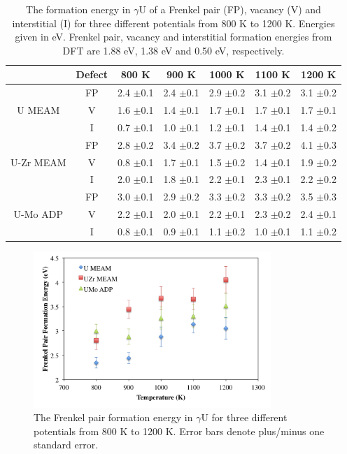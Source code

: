 \documentclass[review]{elsarticle}
\begin{document}
\begin{table}[h]
\caption{The formation energy in $\gamma$U of a Frenkel pair (FP), vacancy (V) and interstitial (I) for three different potentials from 800 K to 1200 K. Energies given in eV. Frenkel pair, vacancy and interstitial formation energies from DFT \cite{beeler2010} are 1.88 eV, 1.38 eV and 0.50 eV, respectively. } \label{tab:eform}
\begin{center}
\begin{tabular}{|c|c|c|c|c|c|c|}
	\hline
			& Defect	& 800 K & 900 K & 1000 K & 1100 K & 1200 K \\
	 \hline
			& FP	 & 2.4 $\pm$0.1 & 2.4 $\pm$0.1 & 2.9 $\pm$0.2 & 3.1 $\pm$0.2 & 3.1 $\pm$0.2  \\
	 U MEAM 	& V	& 1.6 $\pm$0.1 & 1.4 $\pm$0.1 & 1.7 $\pm$0.1 & 1.7 $\pm$0.1 & 1.7 $\pm$0.1  \\
	 		& I	& 0.7 $\pm$0.1 & 1.0 $\pm$0.1 & 1.2 $\pm$0.1 & 1.4 $\pm$0.1 & 1.4 $\pm$0.2   \\
	\hline
	 		& FP	& 2.8 $\pm$0.2 & 3.4 $\pm$0.2 & 3.7 $\pm$0.2 & 3.7 $\pm$0.2 & 4.1 $\pm$0.3 \\
	 U-Zr MEAM & V & 0.8 $\pm$0.1 & 1.7 $\pm$0.1 & 1.5 $\pm$0.2 & 1.4 $\pm$0.1 & 1.9 $\pm$0.2 \\
			& I	& 2.0 $\pm$0.1 & 1.8 $\pm$0.1 & 2.2 $\pm$0.1 & 2.3 $\pm$0.1 & 2.2 $\pm$0.2 \\
	 \hline
	 		& FP	& 3.0 $\pm$0.1 & 2.9 $\pm$0.2 & 3.3 $\pm$0.2 & 3.3 $\pm$0.2 & 3.5 $\pm$0.3 \\
	 U-Mo ADP & V	& 2.2 $\pm$0.1 & 2.0 $\pm$0.1 & 2.2 $\pm$0.1 & 2.3 $\pm$0.2 & 2.4 $\pm$0.1 \\
	 		& I	& 0.8 $\pm$0.1 & 0.9 $\pm$0.1 & 1.1 $\pm$0.2 & 1.0 $\pm$0.1 & 1.1 $\pm$0.2 \\
	 \hline
\end{tabular}
\end{center}
\label{default}
\end{table}

\begin{figure}[h]
 \centering
 \includegraphics[width=0.8\textwidth]{frenkel_eform.png} 
 \caption{The Frenkel pair formation energy in $\gamma$U for three different potentials from 800 K to 1200 K. Error bars denote plus/minus one standard error.}
 \label{fig:eform}
\end{figure}
\end{document}
